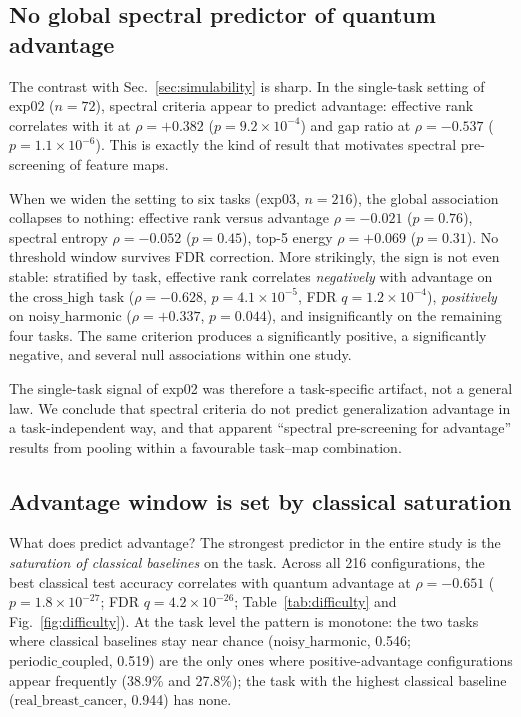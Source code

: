 \documentclass[a4paper,unpublished,onecolumn,nopdfoutputerror,12pt]{quantumarticle}
\begin{document}
\subsection{No global spectral predictor of quantum advantage}
\label{sec:no-global}

The contrast with Sec.~\ref{sec:simulability} is sharp. In the single-task setting of
exp02 ($n=72$), spectral criteria appear to predict advantage: effective rank correlates
with it at $\rho=+0.382$ ($p=9.2\times10^{-4}$) and gap ratio at $\rho=-0.537$
($p=1.1\times10^{-6}$). This is exactly the kind of result that motivates spectral
pre-screening of feature maps.

When we widen the setting to six tasks (exp03, $n=216$), the global association
collapses to nothing: effective rank versus advantage $\rho=-0.021$ ($p=0.76$), spectral
entropy $\rho=-0.052$ ($p=0.45$), top-5 energy $\rho=+0.069$ ($p=0.31$). No threshold
window survives FDR correction. More strikingly, the sign is not even stable: stratified
by task, effective rank correlates \emph{negatively} with advantage on the
$\mathrm{cross\_high}$ task ($\rho=-0.628$, $p=4.1\times10^{-5}$, FDR $q=1.2\times10^{-4}$),
\emph{positively} on $\mathrm{noisy\_harmonic}$ ($\rho=+0.337$, $p=0.044$), and
insignificantly on the remaining four tasks. The same criterion produces a significantly
positive, a significantly negative, and several null associations within one study.

The single-task signal of exp02 was therefore a task-specific artifact, not a general
law. We conclude that spectral criteria do not predict generalization advantage in a
task-independent way, and that apparent ``spectral pre-screening for advantage'' results
from pooling within a favourable task--map combination.

\subsection{Advantage window is set by classical saturation}
\label{sec:difficulty}

What does predict advantage? The strongest predictor in the entire study is the
\emph{saturation of classical baselines} on the task. Across all 216 configurations,
the best classical test accuracy correlates with quantum advantage at $\rho=-0.651$
($p=1.8\times10^{-27}$; FDR $q=4.2\times10^{-26}$; Table~\ref{tab:difficulty} and
Fig.~\ref{fig:difficulty}). At the task level the pattern is monotone: the two tasks
where classical baselines stay near chance ($\mathrm{noisy\_harmonic}$, 0.546;
$\mathrm{periodic\_coupled}$, 0.519) are the only ones where positive-advantage
configurations appear frequently (38.9\% and 27.8\%); the task with the highest classical
baseline ($\mathrm{real\_breast\_cancer}$, 0.944) has none.
\end{document}
